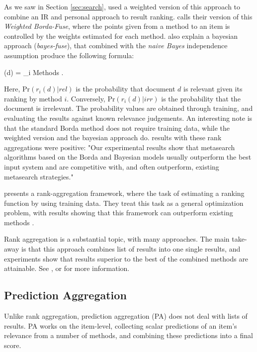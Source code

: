 As we saw in Section \ref{sec:search}, \citet[p3]{Xu2008} used a weighted version
of this approach to combine an IR and personal approach to result ranking.
\citet[p3]{Aslam2001} calls their version of this \emph{Weighted Borda-Fuse},
where the points given from a method to an item is controlled
by the weights estimated for each method.
\citet[p4]{Aslam2001} also explain a bayesian approach (\emph{bayes-fuse}),
that combined with the \emph{naive Bayes} independence assumption 
produce the following formula:

\begin{eqsp}
  (d)  = \sum_{i \in Methods} \log 
    .
\end{eqsp}
%
Here, $\mathrm{Pr}(r_i(d) | rel)$ is the probability that document $d$
is relevant given its ranking by method $i$.
Conversely, $\mathrm{Pr}(r_i(d) | irr)$ is the probability that the document 
is irrelevant. The probability values are obtained through training,
and evaluating the results against known relevance judgements.
An interesting note is that the standard Borda method does not require training data,
while the weighted version and the bayesian approach do.
\citet[p1]{Aslam2001} results with these rank aggregations were positive:
"Our experimental results show that metasearch algorithms based on the 
Borda and Bayesian models usually outperform the best input system 
and are competitive with, and often outperform, 
existing metasearch strategies."

\cite{Liu2007} presents a rank-aggregation framework, where
the task of estimating a ranking function by using training data.
They treat this task as a general optimization problem, with results
showing that this framework can outperform existing methods \cite[p7]{Liu2007}.

Rank aggregation is a substantial topic, with many approaches.
The main take-away is that this approach combines list of results
into one single results, and experiments show that results superior
to the best of the combined methods are attainable.
See \cite{Aslam2001}, \cite{Liu2007} or \cite{Klementiev2008} 
for more information.


\subsection{Prediction Aggregation}
\label{sec:theory:predictionagg}

Unlike rank aggregation, prediction aggregation (PA) does not deal with lists of results.
PA works on the item-level, collecting scalar predictions of an item's relevance from a number of methods,
and combining these predictions into a final score.

